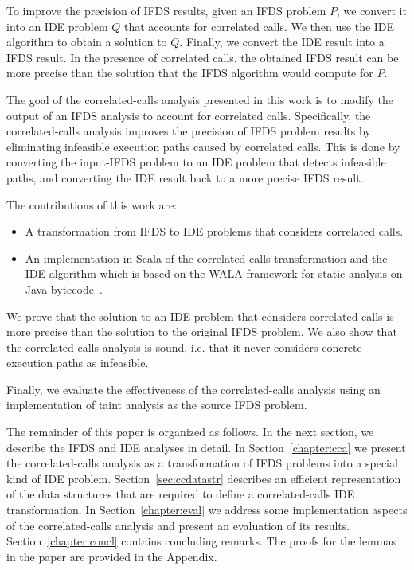 {{To improve the precision of IFDS results, given an IFDS problem $P$, we convert it into an IDE problem $Q$ that accounts for correlated calls. We then use the IDE algorithm to obtain a solution to $Q$. Finally, we convert the IDE result into a IFDS result. In the presence of correlated calls, the obtained IFDS result can be more precise than the solution that the IFDS algorithm would compute for $P$.

The goal of the correlated-calls analysis presented in this work is to modify the output of an IFDS analysis to account for correlated calls. Specifically, the correlated-calls analysis improves the precision of IFDS problem results by eliminating infeasible execution paths caused by correlated calls. This is done by converting the input-IFDS problem to an IDE problem that detects infeasible paths, and converting the IDE result back to a more precise IFDS result.

The contributions of this work are:
\begin{itemize}
  \item A transformation from IFDS to IDE problems that considers correlated calls.
  \item An implementation in Scala of the correlated-calls transformation and the IDE algorithm which is based on the WALA framework for static analysis on Java bytecode~\cite{fink2012wala}.
\end{itemize}

  We prove that the solution to an IDE problem that considers correlated calls is more precise than the solution to the original IFDS problem.
  We also show that the correlated-calls analysis is sound, i.e. that it never considers concrete execution paths as infeasible.

 Finally, we evaluate the effectiveness of the correlated-calls analysis using an implementation of taint analysis as the source IFDS problem.

The remainder of this paper is organized as follows. In the next section, we describe the IFDS and IDE analyses in detail. In Section~\ref{chapter:cca} we present the correlated-calls analysis as a transformation of IFDS problems into a special kind of IDE problem. Section~\ref{sec:ccdatastr} describes an efficient representation of the data structures that are required to define a correlated-calls IDE transformation.
In Section~\ref{chapter:eval} we address some implementation aspects of the correlated-calls analysis and present an evaluation of its results. Section~\ref{chapter:concl} contains concluding remarks. The proofs for the lemmas in the paper are provided in the Appendix.
}
}